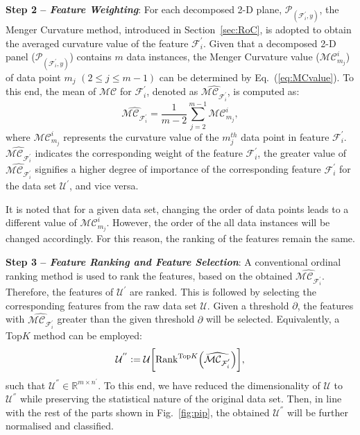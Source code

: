 \documentclass{article}
\newcommand*{\1}{\textcolor{magenta}}
\begin{document}
	\textbf{Step 2 -- \textit{Feature Weighting}}: For each decomposed 2-D plane, $\mathcal{P}_{(\mathcal{F}_i^{'},y)}$, the Menger Curvature method, introduced in Section~\ref{sec:RoC}, is adopted to obtain the averaged curvature value of the feature $\mathcal{F}_i^{'}$. Given that a decomposed 2-D panel ($\mathcal{P}_{(\mathcal{F}_i^{'},y)}$) contains $m$ data instances, the Menger Curvature value ($\mathcal{MC}_{m_j}^i$) of data point $m_j$ $(2\leqslant j \leqslant m-1)$ can be determined by Eq.~(\ref{eq:MCvalue}). To this end, the mean of $\mathcal{MC}$ for $\mathcal{F}_i^{'}$, denoted as $\widehat{\mathcal{MC}_{\mathcal{F}_i^{'}}}$, is computed as:
	\begin{equation}
		\widehat{\mathcal{MC}_{\mathcal{F}_i^{'}}} = \frac{1}{m-2}\sum_{j=2}^{m-1} \mathcal{MC}_{m_j}^i,
	\end{equation}
	where $\mathcal{MC}_{m_j}^i$ represents the curvature value of the $m_j^{th}$ data point in feature $\mathcal{F}_i^{'}$. $\widehat{\mathcal{MC}_{\mathcal{F}_i^{'}}}$ indicates the corresponding weight of the feature $\mathcal{F}_i^{'}$, the greater value of $\widehat{\mathcal{MC}_{\mathcal{F}_i^{'}}}$ signifies a higher degree of importance of the corresponding feature $\mathcal{F}_i^{'}$ for the data set $\mathcal{U}^{'}$, and vice versa. 
	
	It is noted that for a given data set, changing the order of data points leads to a different value of $\mathcal{MC}_{m_j}^i$. However, the order of the all data instances will be changed accordingly. For this reason, the ranking of the features remain the same.
	
	\textbf{Step 3 -- \textit{Feature Ranking and Feature Selection}}: A conventional ordinal ranking method is used to rank the features, based on the obtained $\widehat{\mathcal{MC}_{\mathcal{F}_i^{'}}}$. Therefore, the features of $\mathcal{U}^{'}$ are ranked. This is followed by selecting the corresponding features from the raw data set $\mathcal{U}$. Given a threshold $\partial$, the features with $\widehat{\mathcal{MC}_{\mathcal{F}_i^{'}}}$ greater than the given threshold $\partial$ will be selected. Equivalently, a Top$K$ method can be employed:
	\begin{equation}\label{eq:topK}
		\mathcal{U}^{''} \vcentcolon= \mathcal{U} \bigg[ \textrm{Rank}^{\textrm{Top$K$}}\Big( \widehat{\mathcal{MC}_{\mathcal{F}_i^{'}}}\Big)\bigg],
	\end{equation}
	such that $\mathcal{U}^{''} \in \mathbb{R}^{m\times n^{'}}$. To this end, we have reduced the dimensionality of $\mathcal{U}$ to $\mathcal{U}^{''}$ while preserving the statistical nature of the original data set. Then, in line with the rest of the parts shown in Fig.~\ref{fig:pip}, the obtained $\mathcal{U}^{''}$ will be further normalised and classified.
	
\end{document}
